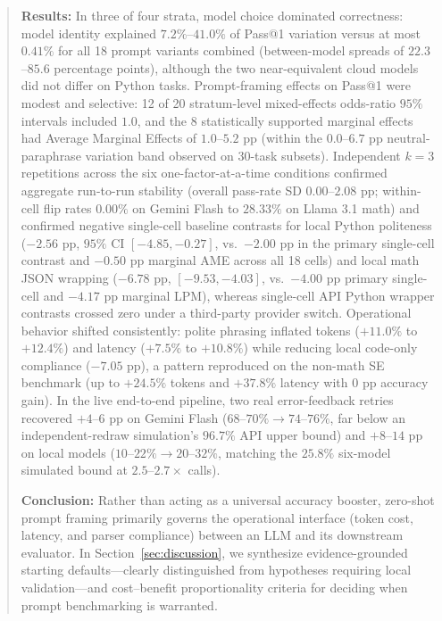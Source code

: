 \documentclass[a4paper,fleqn]{cas-sc}
\begin{document}
\begin{abstract}
\textbf{Results:} In three of four strata, model choice dominated correctness: model identity explained $7.2\%$--$41.0\%$ of Pass@1 variation versus at most $0.41\%$ for all 18 prompt variants combined (between-model spreads of $22.3$--$85.6$ percentage points), although the two near-equivalent cloud models did not differ on Python tasks. Prompt-framing effects on Pass@1 were modest and selective: 12 of 20 stratum-level mixed-effects odds-ratio $95\%$ intervals included $1.0$, and the 8 statistically supported marginal effects had Average Marginal Effects of $1.0$--$5.2$ pp (within the $0.0$--$6.7$ pp neutral-paraphrase variation band observed on 30-task subsets). Independent $k = 3$ repetitions across the six one-factor-at-a-time conditions confirmed aggregate run-to-run stability (overall pass-rate SD $0.00$--$2.08$ pp; within-cell flip rates $0.00\%$ on Gemini Flash to $28.33\%$ on Llama 3.1 math) and confirmed negative single-cell baseline contrasts for local Python politeness ($-2.56$ pp, $95\%$ CI $[-4.85, -0.27]$, vs.\ $-2.00$ pp in the primary single-cell contrast and $-0.50$ pp marginal AME across all 18 cells) and local math JSON wrapping ($-6.78$ pp, $[-9.53, -4.03]$, vs.\ $-4.00$ pp primary single-cell and $-4.17$ pp marginal LPM), whereas single-cell API Python wrapper contrasts crossed zero under a third-party provider switch. Operational behavior shifted consistently: polite phrasing inflated tokens ($+11.0\%$ to $+12.4\%$) and latency ($+7.5\%$ to $+10.8\%$) while reducing local code-only compliance ($-7.05$ pp), a pattern reproduced on the non-math SE benchmark (up to $+24.5\%$ tokens and $+37.8\%$ latency with $0$ pp accuracy gain). In the live end-to-end pipeline, two real error-feedback retries recovered $+4$--$6$ pp on Gemini Flash ($68$--$70\% \to 74$--$76\%$, far below an independent-redraw simulation's $96.7\%$ API upper bound) and $+8$--$14$ pp on local models ($10$--$22\% \to 20$--$32\%$, matching the $25.8\%$ six-model simulated bound at $2.5$--$2.7\times$ calls).

\textbf{Conclusion:} Rather than acting as a universal accuracy booster, zero-shot prompt framing primarily governs the operational interface (token cost, latency, and parser compliance) between an LLM and its downstream evaluator. In Section~\ref{sec:discussion}, we synthesize evidence-grounded starting defaults—clearly distinguished from hypotheses requiring local validation—and cost--benefit proportionality criteria for deciding when prompt benchmarking is warranted.
\end{abstract}
\end{document}
